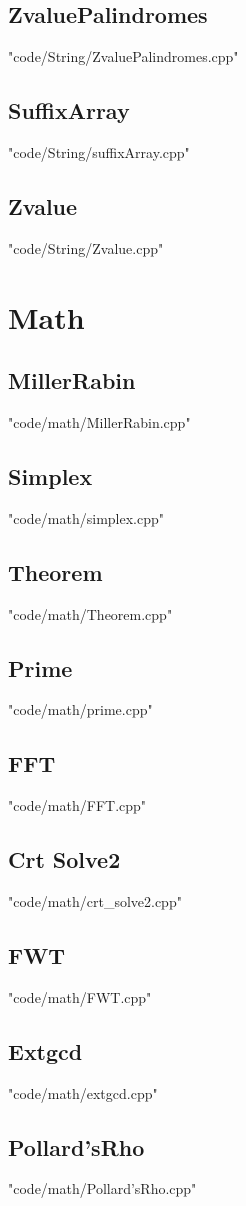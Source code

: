 \documentclass [8pt,a4paper,twocolumn]{article}
\begin{document}
\subsection{ZvaluePalindromes}
 {"code/String/ZvaluePalindromes.cpp"}
\subsection{SuffixArray}
 {"code/String/suffixArray.cpp"}
\subsection{Zvalue}
 {"code/String/Zvalue.cpp"}
\section{Math}
\subsection{MillerRabin}
 {"code/math/MillerRabin.cpp"}
\subsection{Simplex}
 {"code/math/simplex.cpp"}
\subsection{Theorem}
 {"code/math/Theorem.cpp"}
\subsection{Prime}
 {"code/math/prime.cpp"}
\subsection{FFT}
 {"code/math/FFT.cpp"}
\subsection{Crt Solve2}
 {"code/math/crt_solve2.cpp"}
\subsection{FWT}
 {"code/math/FWT.cpp"}
\subsection{Extgcd}
 {"code/math/extgcd.cpp"}
\subsection{Pollard’sRho}
 {"code/math/Pollard’sRho.cpp"}


\end{document}
